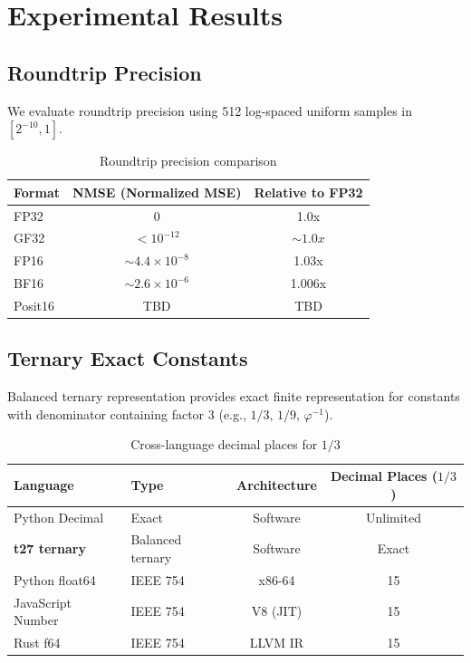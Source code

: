 \documentclass{article}
\begin{document}
\section{Experimental Results}

\subsection{Roundtrip Precision}

We evaluate roundtrip precision using 512 log-spaced uniform samples in $[2^{-10}, 1]$.

\begin{table}[h]
\centering
\begin{tabular}{lcc}
\toprule
Format & NMSE (Normalized MSE) & Relative to FP32 \\
\midrule
FP32   & 0                    & 1.0x \\
GF32   & $< 10^{-12}$           & $\sim 1.0x$ \\
FP16   & $\sim 4.4 \times 10^{-8}$ & 1.03x \\
BF16   & $\sim 2.6 \times 10^{-6}$ & 1.006x \\
Posit16& TBD & TBD \\
\bottomrule
\end{tabular}
\caption{Roundtrip precision comparison}
\end{table}

\subsection{Ternary Exact Constants}

Balanced ternary representation provides exact finite representation for constants with denominator containing factor 3 (e.g., $1/3$, $1/9$, $\varphi^{-1}$).

\begin{table}[h]
\centering
\begin{tabular}{llcc}
\toprule
Language & Type & Architecture & Decimal Places ($1/3$) \\
\midrule
Python Decimal & Exact & Software & Unlimited \\
\textbf{t27 ternary} & Balanced ternary & Software & Exact \\
Python float64 & IEEE 754 & x86-64 & 15 \\
JavaScript Number & IEEE 754 & V8 (JIT) & 15 \\
Rust f64 & IEEE 754 & LLVM IR & 15 \\
\bottomrule
\end{tabular}
\caption{Cross-language decimal places for $1/3$}
\end{table}
\end{document}
